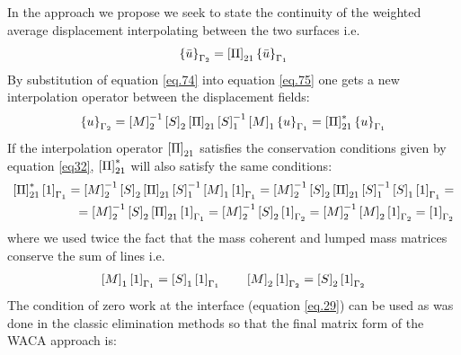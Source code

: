In the approach we propose we seek to state the continuity of the weighted average displacement interpolating between the two surfaces i.e.
\begin{equation}
\label{eq.75}
\left\lbrace{\bar{u}}\right \rbrace_{\Gamma_2}=\left[{\Pi}\right]_{21}\left\lbrace{\bar{u}}\right \rbrace_{\Gamma_1}
\end{equation}
By substitution of equation \eqref{eq.74}  into equation  \eqref{eq.75} one gets a new interpolation operator between the displacement fields:
\begin{equation}
\label{eq.76}
\left\lbrace{u}\right \rbrace_{\Gamma_2}=\left[{M}\right]_{2}^{-1}\left[{S}\right]_2\left[{\Pi}\right]_{21}\left[{S}\right]_1^{-1}\left[{M}\right]_{1}\left\lbrace{u}\right \rbrace_{\Gamma_1}=\left[{\Pi}\right]_{21}^{*}\left\lbrace{u}\right \rbrace_{\Gamma_1}
\end{equation}
If the interpolation operator $\left[{\Pi}\right]_{21}$ satisfies the conservation conditions given by equation \eqref{eq32}, $\left[{\Pi}\right]^{*}_{21}$ will also satisfy the same conditions:
\begin{equation}
\label{eq.77}
\begin{aligned}
\left[{\Pi}\right]_{21}^{*}\left[{1}\right]_{\Gamma_1}=\left[{M}\right]_{2}^{-1}\left[{S}\right]_2\left[{\Pi}\right]_{21}\left[{S}\right]_1^{-1}\left[{M}\right]_{1}\left[{1}\right]_{\Gamma_1}=\left[{M}\right]_{2}^{-1}\left[{S}\right]_2\left[{\Pi}\right]_{21}\left[{S}\right]_1^{-1}\left[{S}\right]_1\left[{1}\right]_{\Gamma_1}=\\=
\left[{M}\right]_{2}^{-1}\left[{S}\right]_2\left[{\Pi}\right]_{21}\left[{1}\right]_{\Gamma_1}=\left[{M}\right]_{2}^{-1}\left[{S}\right]_2\left[{1}\right]_{\Gamma_2}=\left[{M}\right]_{2}^{-1}\left[{M}\right]_{2}\left[{1}\right]_{\Gamma_2}=\left[{1}\right]_{\Gamma_2}
\end{aligned}
\end{equation}
where we used twice the fact that the mass coherent and lumped mass matrices conserve the sum of lines i.e.
\begin{eqnarray}
\label{eq.78}
\left[{M}\right]_{1}\left[{1}\right]_{\Gamma_1}=\left[{S}\right]_{1}\left[{1}\right]_{\Gamma_1} \qquad \left[{M}\right]_{2}\left[{1}\right]_{\Gamma_2}=\left[{S}\right]_{2}\left[{1}\right]_{\Gamma_2} 
\end{eqnarray}
The condition of zero work at the interface (equation \eqref{eq.29}) can be used as was done in the classic elimination methods so that the final matrix form of the WACA approach is:
